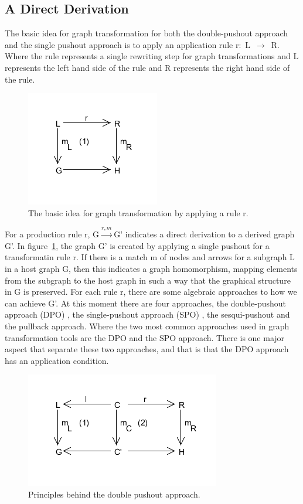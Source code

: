 \subsection{A Direct Derivation}
The basic idea for graph transformation for both the double-pushout
approach and the single pushout approach is to apply an application rule
\mbox{r: L $\longrightarrow$ R}. Where the rule represents a single rewriting
step for graph transformations and L represents the left hand side of the rule and R
represents the right hand side of the rule.

\begin{figure}[H]
	\centering
	\includegraphics[scale=0.7]{./Figures/Single_Pushout.png}
	\caption[Idea of graph transformation]
	{The basic idea for graph transformation by applying a rule r.}
	\label{fig:GraphTransformationGeneral}
\end{figure}

For a production rule r, \mbox{G$\xrightarrow{r,m}$G'} indicates a direct
derivation to a derived graph G'. In
figure~\ref{fig:GraphTransformationGeneral}, the graph G' is created by
applying a single pushout for a transformatin rule r. If there is a match m of
nodes and arrows for a subgraph L in a host graph G, then this indicates a
graph homomorphism, mapping elements from the subgraph to the host graph in
such a way that the graphical structure in G is preserved. For each rule r,
there are some algebraic approaches to how we can achieve G'. At this moment
there are four approaches, the double-pushout approach (DPO) \cite{Loewe1997}, the
single-pushout approach (SPO) \cite{Ehrig1997}, the sesqui-pushout and the
pullback approach. Where the two most common approaches used in graph
transformation tools are the DPO and the SPO approach. There is one major
aspect that separate these two approaches, and that is that the DPO approach
has an application condition.

\begin{figure}[H]
	\centering
	\includegraphics[scale=0.7]{./Figures/Double_Pushout.png}
	\caption[The Double Pushout approach]
	{Principles behind the double pushout approach.}
	\label{fig:DPO}
\end{figure}

